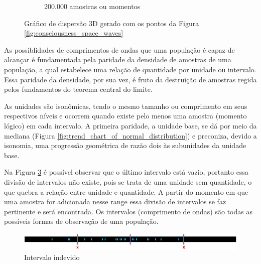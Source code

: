 \begin{figure}[H]
\begin{subfigure}[H]{0.47\linewidth}
		\caption{200.000 amostras ou momentos}
		\label{fig:consciousness_space_3DScatter_200000-2}
		\end{subfigure}%
	\caption{Gráfico de dispersão 3D gerado com os pontos da Figura \ref{fig:consciousness_space_waves}}
	\end{figure}

As possiblidades de comprimentos de ondas que uma população é capaz de alcançar é fundamentada pela paridade da densidade de amostras de uma população, a qual estabelece uma relação de quantidade por unidade ou intervalo. Essa paridade da densidade, por sua vez, é fruto da destruição de amostras regida pelos fundamentos do teorema central do limite. 

As unidades são isonômicas, tendo o mesmo tamanho ou comprimento em seus respectivos níveis e ocorrem quando existe pelo menos uma amostra (momento lógico) em cada intervalo. A primeira paridade, a unidade base, se dá por meio da mediana (Figura \ref{fig:trend_chart_of_normal_distribution}) e preconiza, devido a isonomia, uma progressão geométrica de razão dois às subunidades da unidade base.

Na Figura \ref{fig:consciousness_space_subconsciousness_intervals} é possível observar que o último intervalo está vazio, portanto essa divisão de intervalos não existe, pois se trata de uma unidade sem quantidade, o que quebra a relação entre unidade e quantidade. A partir do momento em que uma amostra for adicionada nesse range essa divisão de intervalos se faz pertinente e será encontrada. Os intervalos (comprimento de ondas) são todas as possíveis formas de observação de uma população.
	\begin{figure}[H]
	\caption{Intervalo indevido}
	\label{fig:consciousness_space_subconsciousness_intervals}
	\centering
	\includegraphics[scale=.7]{sections/images/consciousness_space_subconsciousness_intervals.jpg}
	\end{figure}

